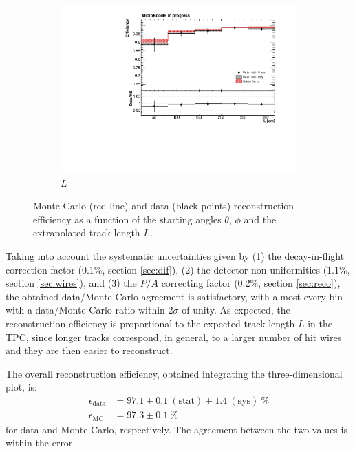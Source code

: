 \documentclass[a4paper]{scrartcl}
\begin{document}
\begin{figure}[htbp]
\begin{center}
\begin{subfigure}{0.6\textwidth}
      \includegraphics[width=\linewidth]{figures/l.pdf}
      \caption{$L$} \label{fig:l}
    \end{subfigure}
    \caption{Monte Carlo (red line) and data (black points) reconstruction efficiency as a function of the starting angles $\theta$, $\phi$ and the extrapolated track length $L$.}\label{fig:1d}
  \end{center}
\end{figure}

Taking into account the systematic uncertainties given by (1) the decay-in-flight correction factor (0.1\%, section \ref{sec:dif}), (2) the detector non-uniformities (1.1\%, section \ref{sec:wires}), and (3) the $P/A$ correcting factor (0.2\%, section \ref{sec:reco}), the obtained data/Monte Carlo agreement is satisfactory, with almost every bin with a data/Monte Carlo ratio within 2$\sigma$ of unity. As expected, the reconstruction efficiency is proportional to the expected track length $L$ in the TPC, since longer tracks correspond, in general, to a larger number of hit wires and they are then easier to reconstruct.

The overall reconstruction efficiency, obtained integrating the three-dimensional plot, is:
\begin{align*}
\epsilon_{\mathrm{data}} &= 97.1 \pm 0.1~\mathrm{(stat)} \pm 1.4~\mathrm{(sys)}~\%\\
\epsilon_{\mathrm{MC}} &= 97.3 \pm 0.1~\%
\end{align*} for data and Monte Carlo, respectively. The agreement between the two values is within the error.
\end{document}
